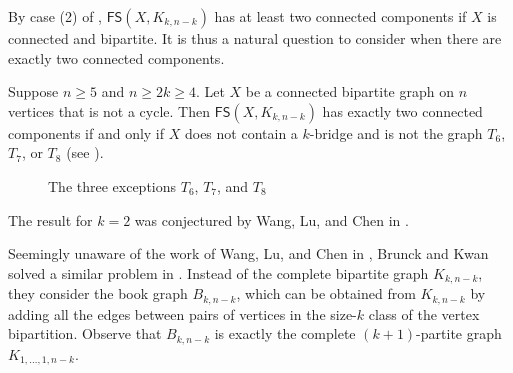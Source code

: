 \documentclass{mystyle}
\newcommand{\FS}{\mathsf{FS}}
\begin{document}
By case (2) of , $\FS(X, K_{k, n-k})$ has at least two connected components if $X$ is connected and bipartite. It is thus a natural question to consider when there are exactly two connected components.
\begin{theorem}\label{thm_two_comps}
    Suppose $n \geq 5$ and $n \geq 2k \geq 4$. Let $X$ be a connected bipartite graph on $n$ vertices that is not a cycle. Then $\FS(X, K_{k, n-k})$ has exactly two connected components if and only if $X$ does not contain a $k$-bridge and is not the graph $T_6$, $T_7$, or $T_8$ (see ).
    \begin{figure}[ht]
    \centering
    \caption{The three exceptions $T_6$, $T_7$, and $T_8$}
    \label{fig_exceptions}
\end{figure}
\end{theorem}
The result for $k = 2$ was conjectured by Wang, Lu, and Chen in \cite{wang2023}.

Seemingly unaware of the work of Wang, Lu, and Chen in \cite{wang2023}, Brunck and Kwan solved a similar problem in \cite{brunck2023}. Instead of the complete bipartite graph $K_{k, n - k}$, they consider the book graph $B_{k, n - k}$, which can be obtained from $K_{k, n - k}$ by adding all the edges between pairs of vertices in the size-$k$ class of the vertex bipartition. Observe that $B_{k, n - k}$ is exactly the complete $(k+1)$-partite graph $K_{1, \ldots, 1, n-k}$. 
\end{document}

